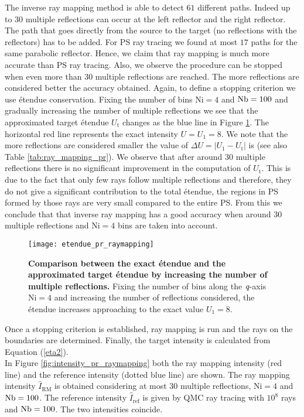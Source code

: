 The inverse ray mapping method is able to detect $61$ different paths. Indeed up to $30$ multiple reflections can occur at the left reflector and the right reflector. The path that goes directly from the source to the target (no reflections with the reflectors) has to be added. For PS ray tracing we found at most $17$ paths for the same parabolic reflector. Hence, we claim that ray mapping is much more accurate than PS ray tracing. Also, we observe the procedure can be stopped when even more than $30$ multiple reflections are reached. The more reflections are considered better the accuracy obtained. Again, to define a stopping criterion we use \'{e}tendue conservation. Fixing the number of bins $\textrm{Ni}=4$ and $\textrm{Nb}=100$ and gradually increasing the number of multiple reflections we see that the approximated target \'{e}tendue $U_{\textrm{t}}$ changes as the blue line in Figure \ref{fig:etendue_pr_raymapping}. The horizontal red line represents the exact intensity $U = U_{1} = 8$. We note that the more reflections are considered smaller the value of $\Delta U = |U_1-U_{\textrm{t}}|$ is (see also Table \ref{tab:ray_mapping_pr}). We observe that after around $30$ multiple reflections there is no significant improvement in the computation of $U_{\textrm{t}}$. This is due to the fact that only few rays follow multiple reflections and therefore, they do not give a significant contribution to the total \'{e}tendue, the regions in PS formed by those rays are very small compared to the entire PS. From this we conclude that that inverse ray mapping has a good accuracy when around $30$ multiple reflections and $\textrm{Ni}=4$ bins are taken into account.
\begin{figure}[h]
  \begin{center}
  \texttt{[image: etendue\_pr\_raymapping]}
  \end{center}
  \caption{\textbf{Comparison between the exact \'{e}tendue and the approximated target \'{e}tendue by increasing the number of multiple reflections.}
Fixing the number of bins along the $\textit{q}$-axis $\textrm{Ni}=4$ and increasing the number of reflections considered, the \'{e}tendue increases approaching to the exact value $U_1=8$.}
\label{fig:etendue_pr_raymapping}
 \end{figure}
Once a stopping criterion is established, ray mapping is run and the rays on the boundaries are determined. Finally, the target intensity is calculated from Equation (\ref{eta2}). 
\\ \indent In Figure \ref{fig:intensity_pr_raymapping} both the ray mapping intensity (red line) and the reference intensity (dotted blue line) are shown. The ray mapping intensity $\hat{I}_{\textrm{RM}}$ is obtained considering at most $30$ multiple reflections, $\textrm{Ni}=4$ and $\textrm{Nb} = 100$. The reference intensity $\hat{I}_{\textrm{ref}}$ is given by QMC ray tracing with $10^8$ rays and $\textrm{Nb} = 100$. The two intensities coincide.
